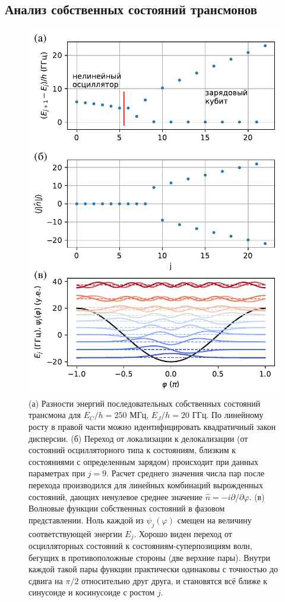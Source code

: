 \documentclass[14pt, a4paper]{extreport}
\numberwithin{equation}{section}
\begin{document}
\subsection{Анализ собственных состояний трансмонов}




\begin{figure}
	\centering
	\includegraphics[width=0.6\linewidth]{Pictures/transmon_levels}
	\caption{(а) Разности энергий последовательных собственных состояний трансмона для $E_C/h = 250$ МГц, $E_J/h = 20$ ГГц. По линейному росту в правой части можно идентифицировать квадратичный закон дисперсии. (б) Переход от локализации к делокализации (от состояний осцилляторного типа к состояниям, близким к состояниями с определенным зарядом) происходит при данных параметрах при $j=9$. Расчет среднего значения числа пар после перехода производился для линейных комбинаций вырожденных состояний, дающих ненулевое среднее значение $\hat n = -i \partial/\partial \varphi$. (в) Волновые функции собственных состояний в фазовом представлении. Ноль каждой из $\psi_j(\varphi)$ смещен на величину соответствующей энергии $E_j$. Хорошо виден переход от осцилляторных состояний к состояниям-суперпозициям волн, бегущих в противоположные стороны (две верхние пары). Внутри каждой такой пары функции практически одинаковы с точностью до сдвига на $\pi/2$ относительно друг друга, и становятся всё ближе к синусоиде и косинусоиде с ростом $j$.}
	\label{fig:transmonlevels}
\end{figure}
\end{document}
